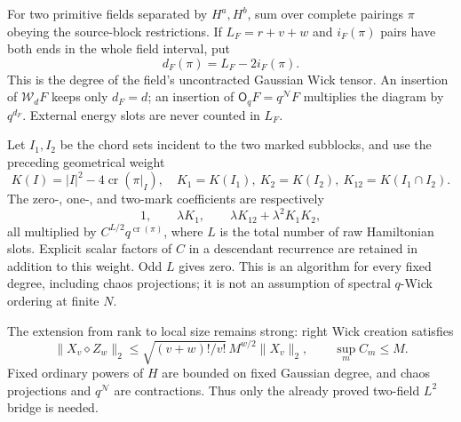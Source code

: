 \documentclass[11pt]{article}
\newcommand{\WW}{\mathcal W}
\newcommand{\NN}{\mathcal N}
\newcommand{\OO}{\mathsf O_q}
\newcommand{\crs}{\operatorname{cr}}
\begin{document}
For two primitive fields separated by $H^a,H^b$, sum over complete
pairings $\pi$ obeying the source-block restrictions. If $L_F=r+v+w$
and $i_F(\pi)$ pairs have both ends in the whole field interval, put
\begin{equation}
 d_F(\pi)=L_F-2i_F(\pi).\label{eq:degree}
\end{equation}
This is the degree of the field's uncontracted Gaussian Wick tensor.
An insertion of $\WW_dF$ keeps only $d_F=d$; an insertion of
$\OO F=q^{\NN}F$ multiplies the diagram by $q^{d_F}$.
External energy slots are never counted in $L_F$.

Let $I_1,I_2$ be the chord sets incident to the two marked subblocks,
and use the preceding geometrical weight
\begin{equation}
 K(I)=|I|^2-4\crs(\pi|_I),\quad
 K_1=K(I_1),\ K_2=K(I_2),\ K_{12}=K(I_1\cap I_2).
\end{equation}
The zero-, one-, and two-mark coefficients are respectively
\begin{equation}
 1,\qquad \lambda K_1,\qquad
 \lambda K_{12}+\lambda^2K_1K_2,\label{eq:marks}
\end{equation}
all multiplied by $C^{L/2}q^{\crs(\pi)}$, where $L$ is the total
number of raw Hamiltonian slots. Explicit scalar factors of $C$
in a descendant recurrence are retained in addition to this weight.
Odd $L$ gives zero. This is an algorithm for every fixed degree,
including chaos projections; it is not an assumption of spectral
$q$-Wick ordering at finite $N$.

The extension from rank to local size remains strong: right Wick
creation satisfies
\begin{equation}
 \|X_v\diamond Z_w\|_2\le
 \sqrt{(v+w)!/v!}\,M^{w/2}\|X_v\|_2,
 \qquad \sup_m C_m\le M.
\end{equation}
Fixed ordinary powers of $H$ are bounded on fixed Gaussian degree,
and chaos projections and $q^{\NN}$ are contractions. Thus only the
already proved two-field $L^2$ bridge is needed.

\newpage
\end{document}
